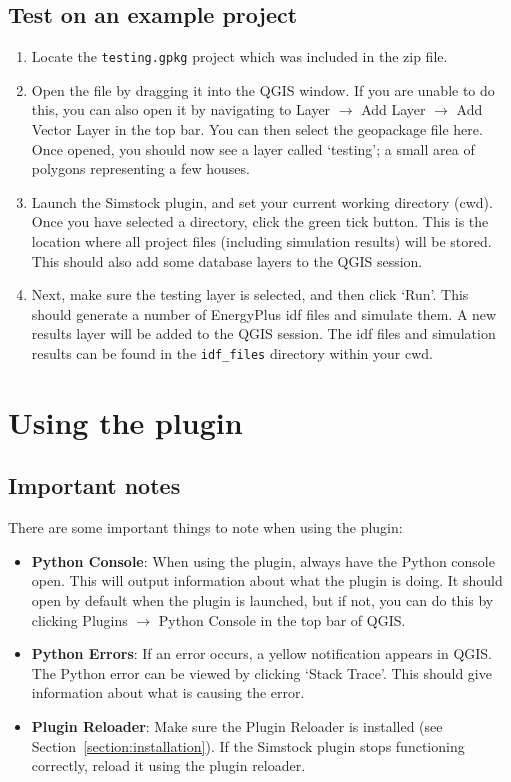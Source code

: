 \documentclass{article}
\begin{document}
\subsection{Test on an example project}
\begin{enumerate}
    \item Locate the \texttt{testing.gpkg} project which was included in the zip file.
    \item Open the file by dragging it into the QGIS window. If you are unable to do this, you can also open it by navigating to Layer $\rightarrow$ Add Layer $\rightarrow$ Add Vector Layer in the top bar. You can then select the geopackage file here. Once opened, you should now see a layer called `testing'; a small area of polygons representing a few houses.
    \item Launch the Simstock plugin, and set your current working directory (cwd). Once you have selected a directory, click the green tick button. This is the location where all project files (including simulation results) will be stored. This should also add some database layers to the QGIS session.
    \item Next, make sure the testing layer is selected, and then click `Run'. This should generate a number of EnergyPlus idf files and simulate them. A new results layer will be added to the QGIS session. The idf files and simulation results can be found in the \texttt{idf\_files} directory within your cwd.
\end{enumerate}
\clearpage

\clearpage
\section{Using the plugin}
\subsection{Important notes}
There are some important things to note when using the plugin:
\begin{itemize}
    \item \textbf{Python Console}: When using the plugin, always have the Python console open. This will output information about what the plugin is doing. It should open by default when the plugin is launched, but if not, you can do this by clicking Plugins $\rightarrow$ Python Console in the top bar of QGIS.
    \item \textbf{Python Errors}: If an error occurs, a yellow notification appears in QGIS. The Python error can be viewed by clicking `Stack Trace'. This should give information about what is causing the error.
    \item \textbf{Plugin Reloader}: Make sure the Plugin Reloader is installed (see Section~\ref{section:installation}). If the Simstock plugin stops functioning correctly, reload it using the plugin reloader.
\end{itemize}
\end{document}
